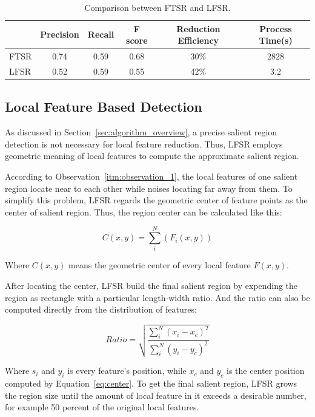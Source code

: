 \begin{table}[!t]
\label{tab:comparison}
\begin{center}
\begin{tabular}{|l|c|c|c|c|c|}
\hline
 & Precision & Recall & F score & Reduction Efficiency & Process Time(s) \\
\hline\hline
FTSR & 0.74 & 0.59 & 0.68 & 30\% & 2828 \\
LFSR & 0.52 & 0.59 & 0.55 & 42\% & 3.2 \\
\hline
\end{tabular}
\end{center}
\caption{Comparison between FTSR and LFSR.}
\end{table}

\subsection{Local Feature Based Detection}
\label{sec:algorithm_detection}

As discussed in Section~\ref{sec:algorithm_overview}, a precise salient region detection is not necessary for local feature reduction. Thus, LFSR employs geometric meaning of local features to compute the approximate salient region.

According to Observation~\ref{itm:observation_1}, the local features of one salient region locate near to each other while noises locating far away from them. To simplify this problem, LFSR regards the geometric center of feature points as the center of salient region. Thus, the region center can be calculated like this:

{\begin{equation} \label{eq:center}
C(x, y) = \sum_{i}^{N}\left({F}_{i}(x, y) \right)
\end{equation}}

Where $C(x, y)$ means the geometric center of every local feature $F(x, y)$.

After locating the center, LFSR build the final salient region by expending the region as rectangle with a particular length-width ratio. And the ratio can also be computed directly from the distribution of features:

{\begin{equation} \label{eq:ratio}
Ratio = \sqrt{\frac{\sum_{i}^{N}\left ( x_{i}-x_{c} \right )^{2}}{\sum_{i}^{N}\left ( y_{i}-y_{c} \right )^{2}}}
\end{equation}}

Where $s_{i}$ and $y_{i}$ is every feature's position, while $x_{c}$ and $y_{c}$ is the center position computed by Equation~\ref{eq:center}. To get the final salient region, LFSR grows the region size until the amount of local feature in it exceeds a desirable number, for example 50 percent of the original local features.


